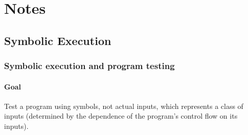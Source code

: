
\section{Notes}

\subsection{Symbolic Execution}

\subsubsection{\cite{K-ACM76} Symbolic execution and program testing} 

\paragraph{Goal}

Test a program using symbols, not actual inputs, which represents a class of inputs (determined by the dependence of the program's control flow on its inputs).


